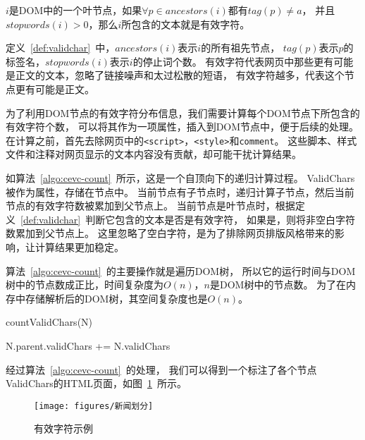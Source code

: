 \begin{definition}
\label{def:validchar}
$i$是DOM中的一个叶节点，如果$\forall p \in ancestors(i)$都有$tag(p) \neq a$，
并且$stopwords(i) > 0$，那么$i$所包含的文本就是有效字符。
\end{definition}

定义~\ref{def:validchar}~中，$ancestors(i)$表示$i$的所有祖先节点，
$tag(p)$表示$p$的标签名，$stopwords(i)$表示$i$的停止词个数。
有效字符代表网页中那些更有可能是正文的文本，忽略了链接噪声和太过松散的短语，
有效字符越多，代表这个节点更有可能是正文。

为了利用DOM节点的有效字符分布信息，我们需要计算每个DOM节点下所包含的有效字符个数，
可以将其作为一项属性，插入到DOM节点中，便于后续的处理。
在计算之前，首先去除网页中的\texttt{<script>}，\texttt{<style>}和\texttt{comment}。
这些脚本、样式文件和注释对网页显示的文本内容没有贡献，却可能干扰计算结果。

如算法~\ref{algo:cevc-count}~所示，这是一个自顶向下的递归计算过程。
ValidChars被作为属性，存储在节点中。
当前节点有子节点时，递归计算子节点，然后当前节点的有效字符数被累加到父节点上。
当前节点是叶节点时，根据定义~\ref{def:validchar}~判断它包含的文本是否是有效字符，
如果是，则将非空白字符数累加到父节点上。
这里忽略了空白字符，是为了排除网页排版风格带来的影响，让计算结果更加稳定。

算法~\ref{algo:cevc-count}~的主要操作就是遍历DOM树，
所以它的运行时间与DOM树中的节点数成正比，时间复杂度为$O(n)$，$n$是DOM树中的节点数。
为了在内存中存储解析后的DOM树，其空间复杂度也是$O(n)$。

\begin{algorithm}[htbp]
\caption{countValidChars(N)}
\label{algo:cevc-count}

 {
  N.parent.validChars += N.validChars \;
}{
}
\end{algorithm}

经过算法~\ref{algo:cevc-count}~的处理，
我们可以得到一个标注了各个节点ValidChars的HTML页面，如图~\ref{fig:validchar}~所示。

\begin{figure}[t]
\centering
\texttt{[image: figures/新闻划分]}
\caption{有效字符示例}
\label{fig:validchar}
\end{figure}

